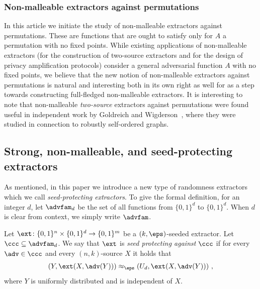 \documentclass{toc}
\begin{document}
%
%
\subsubsection{Non-malleable extractors against permutations}
%
In this %
article  %
we initiate the study of non-malleable extractors against permutations. These are functions that are ought to satisfy  only for  $A$ a permutation with no fixed points. While existing applications of non-malleable extractors (for the construction of %
two-source   %
extractors and for the design of privacy amplification protocols) consider a general adversarial function $A$ with no fixed points, we believe that the new notion of non-malleable extractors against permutations is natural and interesting both in its own right as well for as a step towards constructing full-fledged non-malleable extractors.
It is interesting to note that non-malleable \emph{two-source} extractors against permutations were found useful in
%
independent work  %
by Goldreich and Wigderson~\cite{GW21}, where they
were studied in connection to robustly self-ordered graphs.

\subsection{Strong, non-malleable, and seed-protecting extractors}\label{sec:snsp}
As mentioned, in this %
paper  %
we introduce a new type of randomness extractors which we call \emph{seed-protecting extractors}. To give the formal definition, for an integer $d$, let $\advfam_d$ be the set of all functions from $\{0,1\}^d$ to $\{0,1\}^d$. When $d$ is clear from context, we simply write $\advfam$.%

\begin{definition}\label{def:sp intro}
	Let $\ext \colon \{0,1\}^n \times \{0,1\}^d \to \{0,1\}^m$ be a $(k,\eps)$-seeded extractor. Let $\ccc \subseteq \advfam_d$. We say that $\ext$ is \emph{seed protecting against $\ccc$} if for every $\adv \in \ccc$ and every $(n,k)$-source $X$ it holds that
	\begin{equation}\label{eq:intro 123}
	\left(Y, \ext(X,\adv(Y))\right) \approx_\eps \left(U_d, \ext(X,\adv(Y))\right)\,,
	\end{equation}
	where $Y$ is uniformly distributed and is independent of $X$.
\end{definition}
\end{document}
